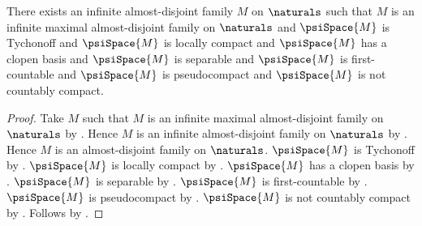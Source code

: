 \begin{theorem}\label{maximal_isbell_mrowka_space_exists}
    There exists an infinite almost-disjoint family $M$ on $\naturals$ such that
        $M$ is an infinite maximal almost-disjoint family on $\naturals$ and
        $\psiSpace{M}$ is Tychonoff and
        $\psiSpace{M}$ is locally compact and
        $\psiSpace{M}$ has a clopen basis and
        $\psiSpace{M}$ is separable and
        $\psiSpace{M}$ is first-countable and
        $\psiSpace{M}$ is pseudocompact and
        $\psiSpace{M}$ is not countably compact.
\end{theorem}
\begin{proof}
    Take $M$ such that
        $M$ is an infinite maximal almost-disjoint family on $\naturals$ by
        .
    Hence $M$ is an infinite almost-disjoint family on $\naturals$ by
        .
    Hence $M$ is an almost-disjoint family on $\naturals$.
    $\psiSpace{M}$ is Tychonoff by .
    $\psiSpace{M}$ is locally compact by
        .
    $\psiSpace{M}$ has a clopen basis by
        .
    $\psiSpace{M}$ is separable by .
    $\psiSpace{M}$ is first-countable by
        .
    $\psiSpace{M}$ is pseudocompact by
        .
    $\psiSpace{M}$ is not countably compact by
        .
    Follows by \auto.
\end{proof}

